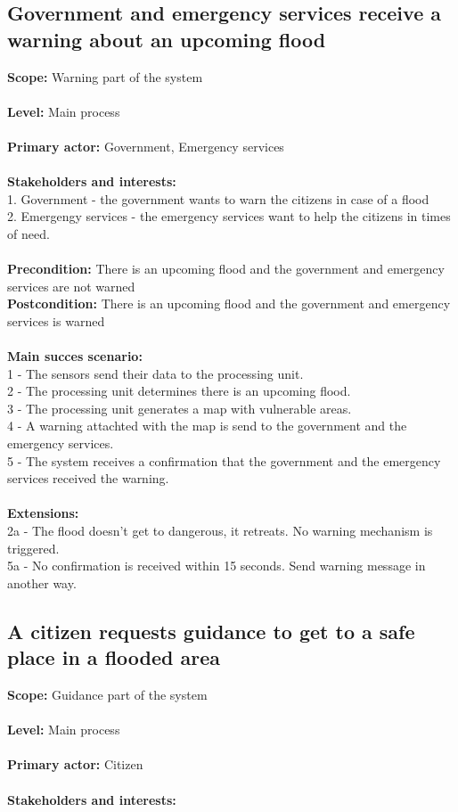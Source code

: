 \subsection{Government and emergency services receive a warning about an upcoming flood}
\textbf{Scope:} Warning part of the system\\\\
\textbf{Level:} Main process\\\\
\textbf{Primary actor:} Government, Emergency services\\\\
\textbf{Stakeholders and interests:}\\
	1. Government - the government wants to warn the citizens in case of a flood \\
	2. Emergengy services - the emergency services want to help the citizens in times of need.\\\\
\textbf{Precondition:} There is an upcoming flood and the government and emergency services are not warned\\
\textbf{Postcondition:} There is an upcoming flood and the government and emergency services is warned\\\\
\textbf{Main succes scenario:} \\
1 - The sensors send their data to the processing unit.\\
2 - The processing unit determines there is an upcoming flood.\\
3 - The processing unit generates a map with vulnerable areas.\\
4 - A warning attachted with the map is send to the government and the emergency services.\\
5 - The system receives a confirmation that the government and the emergency services received the warning.\\\\
\textbf{Extensions:} \\
2a - The flood doesn't get to dangerous, it retreats. No warning mechanism is triggered.\\
5a - No confirmation is received within 15 seconds. Send warning message in another way. 

\subsection{A citizen requests guidance to get to a safe place in a flooded area}
\textbf{Scope:} Guidance part of the system\\\\
\textbf{Level:} Main process\\\\
\textbf{Primary actor:} Citizen\\\\
\textbf{Stakeholders and interests:}\\

